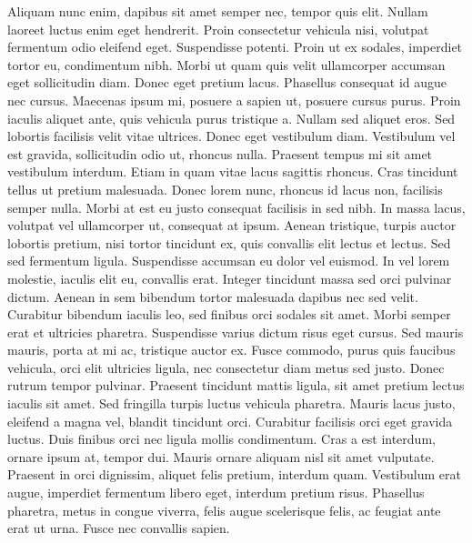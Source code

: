 Aliquam nunc enim, dapibus sit amet semper nec, tempor quis elit. Nullam
laoreet luctus enim eget hendrerit. Proin consectetur vehicula nisi, volutpat
fermentum odio eleifend eget. Suspendisse potenti. Proin ut ex sodales,
imperdiet tortor eu, condimentum nibh. Morbi ut quam quis velit ullamcorper
accumsan eget sollicitudin diam. Donec eget pretium lacus. Phasellus consequat
id augue nec cursus. Maecenas ipsum mi, posuere a sapien ut, posuere cursus
purus. Proin iaculis aliquet ante, quis vehicula purus tristique a. Nullam sed
aliquet eros. Sed lobortis facilisis velit vitae ultrices. Donec eget
vestibulum diam. Vestibulum vel est gravida, sollicitudin odio ut, rhoncus
nulla. Praesent tempus mi sit amet vestibulum interdum. Etiam in quam vitae lacus
sagittis rhoncus. Cras tincidunt tellus ut pretium malesuada. Donec lorem nunc,
rhoncus id lacus non, facilisis semper nulla. Morbi at est eu justo consequat
facilisis in sed nibh. In massa lacus, volutpat vel ullamcorper ut, consequat
at ipsum. Aenean tristique, turpis auctor lobortis pretium, nisi tortor
tincidunt ex, quis convallis elit lectus et lectus.
Sed sed fermentum ligula. Suspendisse accumsan eu dolor vel euismod. In vel
lorem molestie, iaculis elit eu, convallis erat. Integer tincidunt massa sed
orci pulvinar dictum. Aenean in sem bibendum tortor malesuada dapibus nec sed
velit. Curabitur bibendum iaculis leo, sed finibus orci sodales sit amet. Morbi
semper erat et ultricies pharetra. Suspendisse varius dictum risus eget cursus.
Sed mauris mauris, porta at mi ac, tristique auctor ex. Fusce commodo, purus
quis faucibus vehicula, orci elit ultricies ligula, nec consectetur diam metus
sed justo. Donec rutrum tempor pulvinar.
Praesent tincidunt mattis ligula, sit amet pretium lectus iaculis sit amet. Sed
fringilla turpis luctus vehicula pharetra. Mauris lacus justo, eleifend a magna
vel, blandit tincidunt orci. Curabitur facilisis orci eget gravida luctus. Duis
finibus orci nec ligula mollis condimentum. Cras a est interdum, ornare ipsum
at, tempor dui. Mauris ornare aliquam nisl sit amet vulputate. Praesent in orci
dignissim, aliquet felis pretium, interdum quam. Vestibulum erat augue,
imperdiet fermentum libero eget, interdum pretium risus. Phasellus pharetra,
metus in congue viverra, felis augue scelerisque felis, ac feugiat ante erat ut
urna. Fusce nec convallis sapien.

